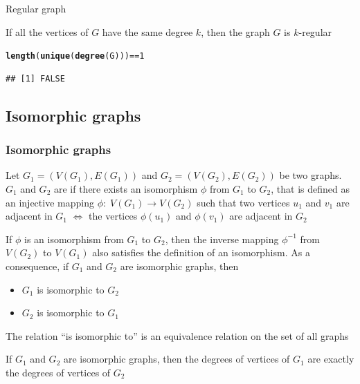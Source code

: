 \documentclass[aspectratio=169]{beamer}\usepackage[]{graphicx}\usepackage[]{xcolor}
\makeatletter
\newcommand{\hlnum}[1]{\textcolor[rgb]{0.686,0.059,0.569}{#1}}%
\newcommand{\hlopt}[1]{\textcolor[rgb]{0,0,0}{#1}}%
\newcommand{\hldef}[1]{\textcolor[rgb]{0.345,0.345,0.345}{#1}}%
\newcommand{\hlkwd}[1]{\textcolor[rgb]{0.737,0.353,0.396}{\textbf{#1}}}%
\newenvironment{kframe}{%
 \def\at@end@of@kframe{}%
 \ifinner\ifhmode%
  \def\at@end@of@kframe{\end{minipage}}%
  \begin{minipage}{\columnwidth}%
 \fi\fi%
 \def\FrameCommand##1{\hskip\@totalleftmargin \hskip-\fboxsep
 \colorbox{shadecolor}{##1}\hskip-\fboxsep
     \hskip-\linewidth \hskip-\@totalleftmargin \hskip\columnwidth}%
 \MakeFramed {\advance\hsize-\width
   \@totalleftmargin\z@ \linewidth\hsize
   \@setminipage}}%
 {\par\unskip\endMakeFramed%
 \at@end@of@kframe}
\newenvironment{knitrout}{}{} %
\makeatother
\begin{document}
\begin{frame}[fragile]{Regular graph}
\begin{definition}
	If all the vertices of $G$ have the same degree $k$, then the graph $G$ is $k$-regular
\end{definition}
\vfill
\begin{knitrout}
\color{fgcolor}\begin{kframe}
\begin{alltt}
\hlkwd{length}\hldef{(}\hlkwd{unique}\hldef{(}\hlkwd{degree}\hldef{(G)))} \hlopt{==} \hlnum{1}
\end{alltt}
\begin{verbatim}
## [1] FALSE
\end{verbatim}
\end{kframe}
\end{knitrout}
\end{frame}




\subsection{Isomorphic graphs}

\begin{frame} \frametitle{Isomorphic graphs} 
\begin{definition}
Let $G_1=(V(G_1),E(G_1))$ and $G_2=(V(G_2),E(G_2))$ be two graphs.
$G_1$ and $G_2$ are  if there exists an isomorphism $\phi$ from $G_1$ to $G_2$, that is defined as an injective mapping $\phi:\; V(G_1) \rightarrow V(G_2)$ such that two vertices $u_1$ and $v_1$ are adjacent in $G_1$ $\iff$ the vertices $\phi(u_1)$ and $\phi(v_1)$ are adjacent in $G_2$
\end{definition}
\end{frame}
 
 
 
\begin{frame}
If $\phi$ is an isomorphism from $G_1$ to $G_2$, then the inverse mapping $\phi ^{-1}$ from $V(G_2)$ to $V(G_1)$ also satisfies the definition of an isomorphism.
As a consequence, if $G_1$ and $G_2$ are isomorphic graphs, then
\begin{itemize}
\item $G_1$ is isomorphic to $G_2$
\item $G_2$ is isomorphic to $G_1$
\end{itemize}
\vfill
\begin{theorem}
The relation ``is isomorphic to'' is an equivalence relation on the set of all graphs
\end{theorem}
\vfill
\begin{theorem}
If $G_1$ and $G_2$ are isomorphic graphs, then the degrees of vertices of $G_1$ are exactly the degrees of vertices of $G_2$
\end{theorem}
\end{frame}
\end{document}
